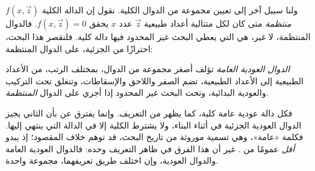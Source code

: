 \documentclass[../../../include/open-logic-section]{subfiles}
\begin{document}

ولنا سبيل آخر إلى تعيين مجموعة من الدوال الكلية. نقول إن الدالة الكلية
$f(x,\vec z)$ \emph{منتظمة} متى كان لكل متتالية أعداد طبيعية
$\vec z$ عدد $x$ يحقق $f(x,\vec z)=0$. فالدوال المنتظمة، لا غير،
هي التي يعطي البحث غير المحدود فيها دالة
كلية. فلنقصر هذا البحث، احترازًا من الجزئية، على الدوال المنتظمة:

\begin{defn}
\emph{الدوال العودية العامة} تؤلف أصغر مجموعة من الدوال، بمختلف الرتب، من
الأعداد الطبيعية إلى الأعداد الطبيعية، تضم الصفر
واللاحق والإسقاطات، وتنغلق تحت التركيب والعودية البدائية، وتحت البحث
غير المحدود إذا أجري على الدوال \emph{المنتظمة}.
\end{defn}

فكل دالة عودية عامة كلية، كما يظهر من التعريف. وإنما يفترق
 عن  بأن
الثاني يجيز الدوال العودية الجزئية في أثناء البناء، ولا يشترط
الكلية إلا في الدالة التي ينتهي إليها. فكلمة «عامة»،
وهي تسمية موروثة من تاريخ البحث، قد توهم خلاف المقصود؛ إذ
 يبدو \emph{أقل} عمومًا من
. غير أن هذا الفرق في ظاهر التعريف وحده:
فالدوال العودية العامة والدوال العودية، وإن اختلف طريق تعريفهما،
مجموعة واحدة.
\end{document}
